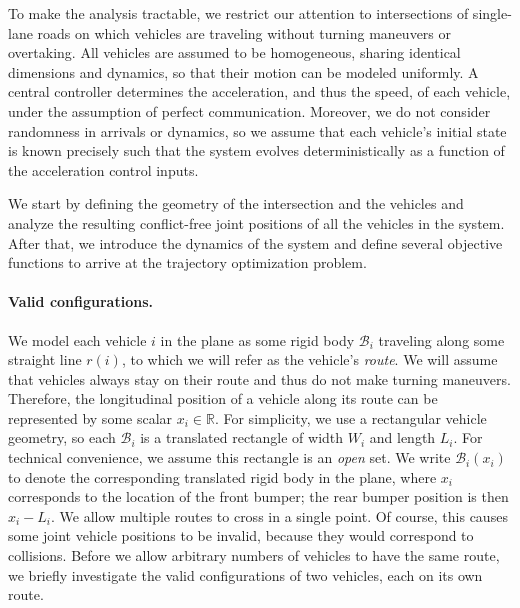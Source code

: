 \documentclass[a4paper]{report}
\theoremstyle{definition}
\theoremstyle{plain}
\begin{document}
To make the analysis tractable, we restrict our attention to intersections of
single-lane roads on which vehicles are traveling without turning maneuvers or
overtaking.
%
All vehicles are assumed to be homogeneous, sharing identical dimensions and
dynamics, so that their motion can be modeled uniformly.
%
A central controller determines the acceleration, and thus the speed, of each
vehicle, under the assumption of perfect communication.
%
Moreover, we do not consider randomness in arrivals or dynamics, so we assume
that each vehicle's initial state is known precisely such that the system
evolves deterministically as a function of the acceleration control inputs.

We start by defining the geometry of the intersection and the vehicles and
analyze the resulting conflict-free joint positions of all the vehicles in the
system.
%
After that, we introduce the dynamics of the system and define several objective
functions to arrive at the trajectory optimization problem.

\paragraph{Valid configurations.}
%
We model each vehicle $i$ in the plane as some rigid body $\mathcal{B}_{i}$
traveling along some straight line $r(i)$, to which we will refer as the
vehicle's \emph{route}.
%
We will assume that vehicles always stay on their route and thus do not make
turning maneuvers.
%
Therefore, the longitudinal position of a vehicle along its route can be
represented by some scalar $x_{i} \in \mathbb{R}$.
%
For simplicity, we use a rectangular vehicle geometry, so each $\mathcal{B}_{i}$
is a translated rectangle of width $W_{i}$ and length $L_{i}$. For technical
convenience, we assume this rectangle is an \emph{open} set. We write
$\mathcal{B}_{i}(x_{i})$ to denote the corresponding translated rigid body in
the plane, where $x_{i}$ corresponds to the location of the front bumper; the
rear bumper position is then $x_{i} - L_{i}$.
%
We allow multiple routes to cross in a single point. Of course, this causes some
joint vehicle positions to be invalid, because they would correspond to
collisions.
%
Before we allow arbitrary numbers of vehicles to have the same route, we briefly
investigate the valid configurations of two vehicles, each on its own route.
\end{document}
